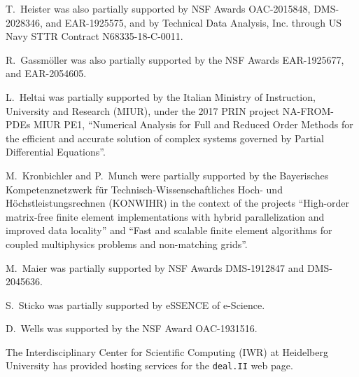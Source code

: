 \documentclass{ansarticle-preprint}
\newcommand{\specialword}[1]{\texttt{#1}}
\newcommand{\dealii}{{\specialword{deal.II}}\xspace}
\begin{document}
T.~Heister was also partially supported by NSF
Awards OAC-2015848, DMS-2028346, and
EAR-1925575, and by Technical Data Analysis, Inc. through US Navy STTR
Contract N68335-18-C-0011.

R.~Gassm{\"o}ller was also partially supported by the NSF Awards
EAR-1925677, and EAR-2054605.

L.~Heltai was partially supported by the Italian Ministry of Instruction,
University and Research (MIUR), under the 2017 PRIN project NA-FROM-PDEs MIUR
PE1, ``Numerical Analysis for Full and Reduced Order Methods for the efficient
and accurate solution of complex systems governed by Partial Differential
Equations''.

M.~Kronbichler and P.~Munch were partially supported by the
Bayerisches Kompetenznetzwerk
f\"ur Technisch-Wissen\-schaft\-li\-ches Hoch- und H\"ochstleistungsrechnen
(KONWIHR) in the context of the projects
``High-order matrix-free finite element implementations with
hybrid parallelization and improved data locality'' and ``Fast and scalable finite element algorithms for coupled multiphysics problems and non-matching grids''.

M.~Maier was partially supported by NSF Awards DMS-1912847 and DMS-2045636.

S.~Sticko was partially supported by eSSENCE of e-Science.

D.~Wells was supported by the NSF Award OAC-1931516.

The Interdisciplinary Center for Scientific Computing (IWR) at Heidelberg
University has provided hosting services for the \dealii{} web page.

{}

\end{document}

